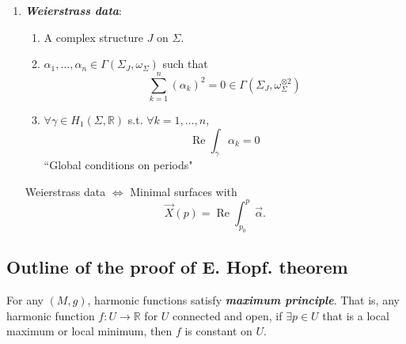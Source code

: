 \begin{enumerate}
\begin{claim}
\end{claim}
\item \textit{\textbf{Weierstrass data}}:
	\begin{enumerate}
	\item A complex structure \(J\) on \(\Sigma\).
	\item \(\alpha_1,\ldots,\alpha_n \in \Gamma(\Sigma_J,\omega_\Sigma)\) such that
		\[\sum_{k=1}^n(\alpha_k)^2=0 \in \Gamma(\Sigma_J,\omega_\Sigma^{\otimes 2})\]
	\item \(\forall \gamma \in H_1(\Sigma,\mathbb{R})\) s.t. \(\forall k=1,\ldots,n\),
		\[\operatorname{Re} \int_\gamma \alpha_k=0\]
		``Global conditions on periods"
	\end{enumerate}
\begin{claim}\leavevmode
Weierstrass data \(\iff\) Minimal surfaces with
\[\vec{X}(p)=\operatorname{Re}\int_{p_0}^p \vec{\alpha}.\]
\end{claim}
\end{enumerate}

\subsection{Outline of the proof of E. Hopf. theorem}

\begin{thm}[E. Hopf]\leavevmode
For any \((M,g)\), harmonic functions satisfy \textit{\textbf{maximum principle}}. That is, any harmonic function \(f:U \to \mathbb{R}\) for \(U\) connected and open, if \(\exists p \in U\) that is a local maximum or local minimum, then \(f\) is constant on \(U\).
\end{thm}

